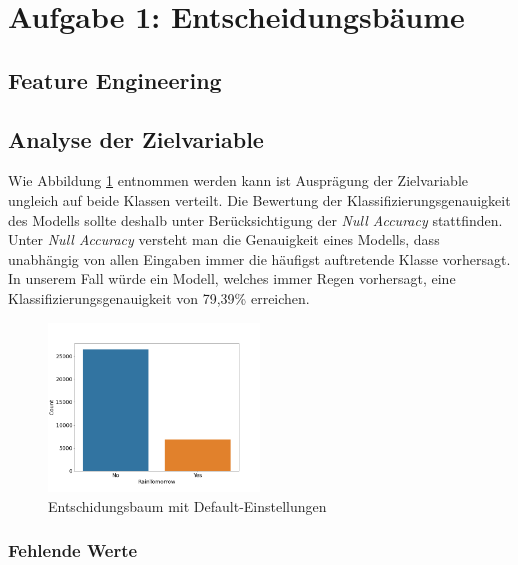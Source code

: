 \section{Aufgabe 1: Entscheidungsbäume}
\subsection{Feature Engineering}

\subsection{Analyse der Zielvariable}

Wie Abbildung \ref{fig:disc_target_variable} entnommen werden kann ist Ausprägung der Zielvariable ungleich auf beide Klassen verteilt. Die Bewertung der Klassifizierungsgenauigkeit des Modells sollte deshalb unter Berücksichtigung der \emph{Null Accuracy} stattfinden. Unter \emph{Null Accuracy} versteht man die Genauigkeit eines Modells, dass unabhängig von allen Eingaben immer die häufigst auftretende  Klasse vorhersagt. In unserem Fall würde ein Modell, welches immer Regen vorhersagt, eine Klassifizierungsgenauigkeit von 79,39\% erreichen.

\begin{figure}[h]
	\centering
	\includegraphics[width = 0.5\textwidth]{Bilder/distribution_target_variable}
	\caption{Entschidungsbaum mit Default-Einstellungen}
	\label{fig:disc_target_variable}
\end{figure}

\subsubsection{Fehlende Werte}

